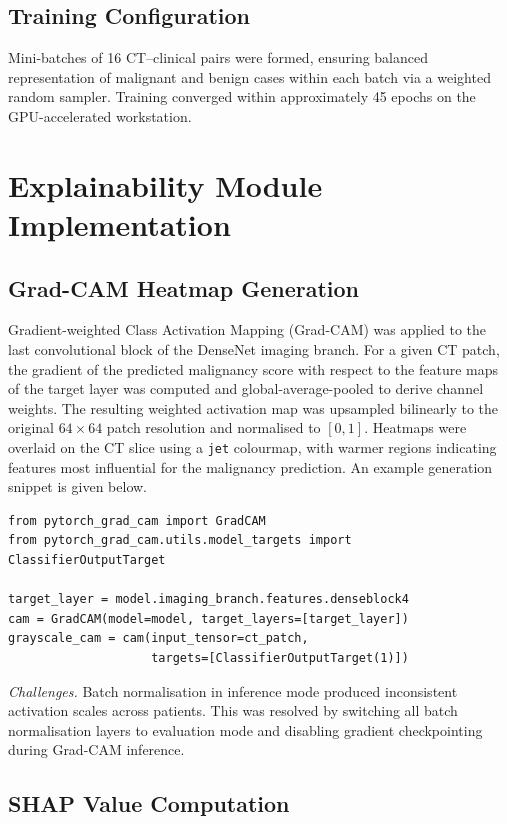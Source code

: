 {\subsection{Training Configuration}

Mini-batches of 16 CT--clinical pairs were formed, ensuring balanced representation of
malignant and benign cases within each batch via a weighted random sampler. Training
converged within approximately 45 epochs on the GPU-accelerated workstation.

\section{Explainability Module Implementation}

\subsection{Grad-CAM Heatmap Generation}

Gradient-weighted Class Activation Mapping (Grad-CAM) was applied to the last convolutional
block of the DenseNet imaging branch. For a given CT patch, the gradient of the predicted
malignancy score with respect to the feature maps of the target layer was computed and
global-average-pooled to derive channel weights. The resulting weighted activation map was
upsampled bilinearly to the original $64 \times 64$ patch resolution and normalised to
$[0,1]$. Heatmaps were overlaid on the CT slice using a \texttt{jet} colourmap, with warmer
regions indicating features most influential for the malignancy prediction. An example
generation snippet is given below.

\begin{verbatim}
from pytorch_grad_cam import GradCAM
from pytorch_grad_cam.utils.model_targets import ClassifierOutputTarget

target_layer = model.imaging_branch.features.denseblock4
cam = GradCAM(model=model, target_layers=[target_layer])
grayscale_cam = cam(input_tensor=ct_patch,
                    targets=[ClassifierOutputTarget(1)])
\end{verbatim}

\textit{Challenges.}
Batch normalisation in inference mode produced inconsistent activation scales across patients.
This was resolved by switching all batch normalisation layers to evaluation mode and disabling
gradient checkpointing during Grad-CAM inference.

\subsection{SHAP Value Computation}

}

